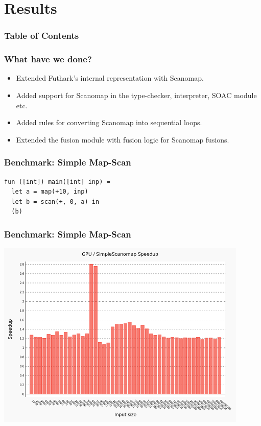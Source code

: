 \documentclass{beamer}
\begin{document}
\section[impl]{Results}
\begin{frame}
\frametitle{Table of Contents}
\tableofcontents[currentsection]
\end{frame}

\begin{frame}
 \frametitle{What have we done?}
 \begin{itemize}
 \item Extended Futhark's internal representation with Scanomap.
 \item Added support for Scanomap in the type-checker, interpreter, SOAC module etc.
 \item Added rules for converting Scanomap into sequential loops.
 \item Extended the fusion module with fusion logic for Scanomap fusions.
 \end{itemize}
\end{frame}

\begin{frame}[fragile]
 \frametitle{Benchmark: Simple Map-Scan}
\begin{lstlisting}
fun ([int]) main([int] inp) =
  let a = map(+10, inp)
  let b = scan(+, 0, a) in
  (b)
\end{lstlisting}
\end{frame}

\begin{frame}
 \frametitle{Benchmark: Simple Map-Scan}
    \includegraphics[width=0.9\textwidth]{../images/comparing.png}
\end{frame}
\end{document}
